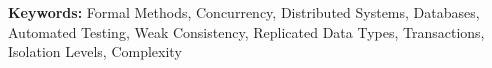 \medskip
\noindent
\textbf{Keywords:} Formal Methods, Concurrency, Distributed Systems, Databases, Automated Testing, Weak Consistency, Replicated Data Types, Transactions, Isolation Levels, Complexity
